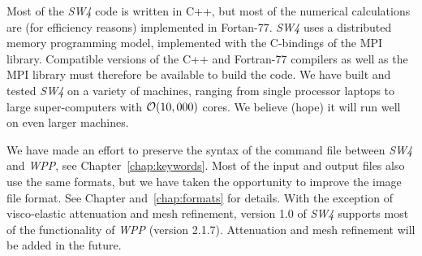 \documentclass[11pt]{report}
\begin{document}


Most of the \emph{SW4} code is written in C++, but most of the numerical calculations are (for
efficiency reasons) implemented in Fortan-77. \emph{SW4} uses a distributed memory programming
model, implemented with the C-bindings of the MPI library. Compatible versions of the C++ and
Fortran-77 compilers as well as the MPI library must therefore be available to build the code. We
have built and tested \emph{SW4} on a variety of machines, ranging from single processor laptops to
large super-computers with ${\cal O}(10,000)$ cores. We believe (hope) it will run well on even
larger machines.

We have made an effort to preserve the syntax of the command file between \emph{SW4} and \emph{WPP},
see Chapter~\ref{chap:keywords}. Most of the input and output files also use the same
formats, but we have taken the opportunity to improve the image file format. See Chapter
and~\ref{chap:formats} for details. With the exception of visco-elastic attenuation and mesh
refinement, version 1.0 of \emph{SW4} supports most of the functionality of \emph{WPP} (version
2.1.7). Attenuation and mesh refinement will be added in the future.
\end{document}
